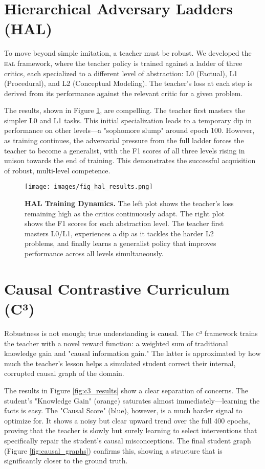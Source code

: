 \documentclass[11pt, letterpaper]{article}
\newcommand{\framework}[1]{\textsc{#1}}
\newcommand{\hal}{\framework{hal}}
\newcommand{\ccc}{\framework{c³}}
\begin{document}
\section{Hierarchical Adversary Ladders (HAL)}
To move beyond simple imitation, a teacher must be robust. We developed the \hal{} framework, where the teacher policy is trained against a ladder of three critics, each specialized to a different level of abstraction: L0 (Factual), L1 (Procedural), and L2 (Conceptual Modeling). The teacher's loss at each step is derived from its performance against the relevant critic for a given problem.

The results, shown in Figure \ref{fig:hal_results}, are compelling. The teacher first masters the simpler L0 and L1 tasks. This initial specialization leads to a temporary dip in performance on other levels---a "sophomore slump" around epoch 100. However, as training continues, the adversarial pressure from the full ladder forces the teacher to become a generalist, with the F1 scores of all three levels rising in unison towards the end of training. This demonstrates the successful acquisition of robust, multi-level competence.

\begin{figure}[h!]
    \centering
    \texttt{[image: images/fig\_hal\_results.png]}
    \caption{\textbf{HAL Training Dynamics.} The left plot shows the teacher's loss remaining high as the critics continuously adapt. The right plot shows the F1 scores for each abstraction level. The teacher first masters L0/L1, experiences a dip as it tackles the harder L2 problems, and finally learns a generalist policy that improves performance across all levels simultaneously.}
    \label{fig:hal_results}
\end{figure}

\section{Causal Contrastive Curriculum (C³)}
Robustness is not enough; true understanding is causal. The \ccc{} framework trains the teacher with a novel reward function: a weighted sum of traditional knowledge gain and "causal information gain." The latter is approximated by how much the teacher's lesson helps a simulated student correct their internal, corrupted causal graph of the domain.

The results in Figure \ref{fig:c3_results} show a clear separation of concerns. The student's "Knowledge Gain" (orange) saturates almost immediately---learning the facts is easy. The "Causal Score" (blue), however, is a much harder signal to optimize for. It shows a noisy but clear upward trend over the full 400 epochs, proving that the teacher is slowly but surely learning to select interventions that specifically repair the student's causal misconceptions. The final student graph (Figure \ref{fig:causal_graphs}) confirms this, showing a structure that is significantly closer to the ground truth.
\end{document}
